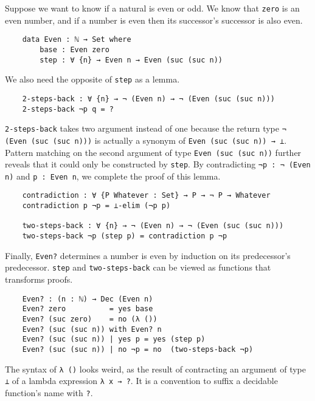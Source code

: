 \documentclass[../thesis.tex]{subfiles}
\begin{document}
Suppose we want to know if a natural  is even or odd. We know that {\lstinline|zero|}
is an even number, and if a number is even then its successor's successor is also even.

\begin{lstlisting}
    data Even : ℕ → Set where
        base : Even zero
        step : ∀ {n} → Even n → Even (suc (suc n))
\end{lstlisting}

We also need the opposite of {\lstinline|step|} as a lemma.

\begin{lstlisting}
    2-steps-back : ∀ {n} → ¬ (Even n) → ¬ (Even (suc (suc n)))
    2-steps-back ¬p q = ?
\end{lstlisting}

{\lstinline|2-steps-back|} takes two argument instead of one because the return
type {\lstinline|¬ (Even (suc (suc n)))|} is actually a synonym of
{\lstinline|Even (suc (suc n)) → ⊥|}. Pattern matching on the second argument
of type {\lstinline|Even (suc (suc n))|} further reveals that it could only be
constructed by {\lstinline|step|}.  By contradicting {\lstinline|¬p : ¬ (Even n)|}
and {\lstinline|p : Even n|}, we complete the proof of this lemma.

\begin{lstlisting}
    contradiction : ∀ {P Whatever : Set} → P → ¬ P → Whatever
    contradiction p ¬p = ⊥-elim (¬p p)

    two-steps-back : ∀ {n} → ¬ (Even n) → ¬ (Even (suc (suc n)))
    two-steps-back ¬p (step p) = contradiction p ¬p
\end{lstlisting}

Finally, {\lstinline|Even?|} determines a number is even by induction on its
predecessor's predecessor. {\lstinline|step|} and {\lstinline|two-steps-back|}
can be viewed as functions that transforms proofs.

\begin{lstlisting}
    Even? : (n : ℕ) → Dec (Even n)
    Even? zero          = yes base
    Even? (suc zero)    = no (λ ())
    Even? (suc (suc n)) with Even? n
    Even? (suc (suc n)) | yes p = yes (step p)
    Even? (suc (suc n)) | no ¬p = no  (two-steps-back ¬p)
\end{lstlisting}

The syntax of {\lstinline|λ ()|} looks weird, as the result of contracting
an argument of type {\lstinline|⊥|} of a lambda expression {\lstinline|λ x → ?|}.
It is a convention to suffix a decidable function's name with {\lstinline|?|}.
\end{document}
